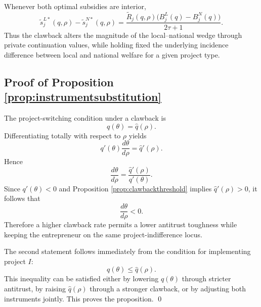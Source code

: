 Whenever both optimal subsidies are interior,
\begin{equation}
    \widetilde s_j^{L*}(q,\rho)-\widetilde s_j^{N*}(q,\rho)
    =
    \frac{
        \widetilde R_j(q,\rho)\bigl(B_j^L(q)-B_j^N(q)\bigr)
    }{2\tau+1}.
\end{equation}
Thus the clawback alters the magnitude of the local--national wedge through private continuation values, while holding fixed the underlying incidence difference between local and national welfare for a given project type.

\subsection{Proof of Proposition \ref{prop:instrumentsubstitution}}

The project-switching condition under a clawback is
\begin{equation}
    q(\theta)=\hat q(\rho).
\end{equation}
Differentiating totally with respect to \(\rho\) yields
\begin{equation}
    q'(\theta)\frac{d\theta}{d\rho}
    =
    \hat q'(\rho).
\end{equation}
Hence
\begin{equation}
    \frac{d\theta}{d\rho}
    =
    \frac{\hat q'(\rho)}{q'(\theta)}.
\end{equation}
Since \(q'(\theta)<0\) and Proposition \ref{prop:clawbackthreshold} implies \(\hat q'(\rho)>0\), it follows that
\begin{equation}
    \frac{d\theta}{d\rho}<0.
\end{equation}
Therefore a higher clawback rate permits a lower antitrust toughness while keeping the entrepreneur on the same project-indifference locus.

The second statement follows immediately from the condition for implementing project \(I\):
\begin{equation}
    q(\theta)\le \hat q(\rho).
\end{equation}
This inequality can be satisfied either by lowering \(q(\theta)\) through stricter antitrust, by raising \(\hat q(\rho)\) through a stronger clawback, or by adjusting both instruments jointly.
This proves the proposition. \qed
